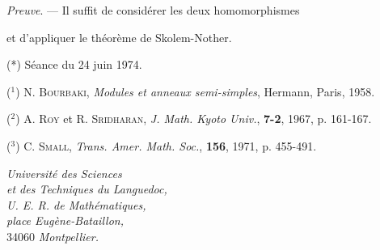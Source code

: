 \emph{Preuve}. — Il suffit de considérer les deux homomorphismes


et d'appliquer le théorème de Skolem-Nother.

(*) Séance du 24 juin 1974.

(${}^1$) N. \textsc{Bourbaki}, \emph{Modules et anneaux semi-simples}, Hermann, Paris, 1958.

(${}^2$) A. \textsc{Roy} et R. \textsc{Sridharan}, \emph{J. Math. Kyoto Univ.}, \textbf{7-2}, 1967, p. 161-167.

(${}^3$) C. \textsc{Small}, \emph{Trans. Amer. Math. Soc.}, \textbf{156}, 1971, p. 455-491.

\begin{flushright}
\emph{Université des Sciences}\\
\emph{et des Techniques du Languedoc,}\\
\emph{U. E. R. de Mathématiques,}\\
\emph{place Eugène-Bataillon,}\\
34060 \emph{Montpellier.}
\end{flushright}

